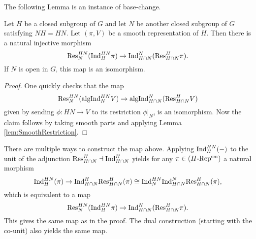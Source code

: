\documentclass[../main.tex]{subfiles}
\begin{document}
The following Lemma is an instance of base-change.
\begin{lem}\label{lem:BaseChangeForResInd}
  Let $H$ be a closed subgroup of $G$ and let $N$ be another closed subgroup
  of $G$ satisfying $NH = HN$. Let $(\pi, V)$ be a smooth representation of $H$.
  Then there is a natural injective morphism
  \begin{equation*}
    \mathrm{Res}_N^{HN} (\mathrm{Ind}_H^{HN} \pi) \to \mathrm{Ind}_{H \cap N}^N(\mathrm{Res}_{H\cap N}^H \pi).
  \end{equation*}
  If $N$ is open in $G$, this map is an isomorphism.
\begin{proof}
  One quickly checks that the map
  \begin{equation*}
    \mathrm{Res}^{HN}_{N}(\mathrm{algInd}_{N}^{HN} V) \to \mathrm{algInd}_{H\cap N}^{N}(\mathrm{Res}_{H \cap N}^H V)
  \end{equation*}
  given by sending $\phi: HN \to V$ to its restriction $\phi|_N$, is an
  isomorphism. Now the claim follows by taking smooth parts and applying Lemma
  \ref{lem:SmoothRestriction}.
\end{proof}
\end{lem}
\begin{rmk} 
  There are multiple ways to construct the map above.
  Applying $\mathrm{Ind}_H^{HN}(-)$ to the unit of the adjunction $\mathrm{Res}_{H\cap N}^H \dashv
  \mathrm{Ind}_{H\cap N}^H$ yields for any $\pi \in {({H}\text-\allowbreak\mathrm{Rep^{\mathrm{sm}}})}$ a natural morphism
  \begin{equation*}
    \mathrm{Ind}_H^{HN}(\pi) \to \mathrm{Ind}_{H\cap N}^H \mathrm{Res}_{H \cap N}^H (\pi) \cong
    \mathrm{Ind}_{N}^{HN} \mathrm{Ind}_{H \cap N}^N \mathrm{Res}_{H \cap N}^H (\pi),
  \end{equation*}
  which is equivalent to a map 
  \begin{equation*}
    \mathrm{Res}_N^{HN} (\mathrm{Ind}_H^{HN} \pi) \to \mathrm{Ind}_{H \cap N}^N(\mathrm{Res}_{H\cap N}^H \pi).
  \end{equation*}
  This gives the same map as in the proof. The dual construction (starting with the
  co-unit) also yields the same map.
\end{rmk}
\end{document}
